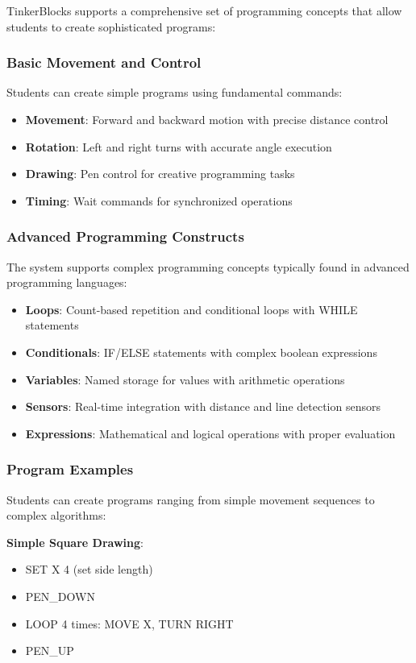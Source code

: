 TinkerBlocks supports a comprehensive set of programming concepts that allow students to create sophisticated programs:

\subsubsection{Basic Movement and Control}
Students can create simple programs using fundamental commands:
\begin{itemize}
    \item \textbf{Movement}: Forward and backward motion with precise distance control
    \item \textbf{Rotation}: Left and right turns with accurate angle execution
    \item \textbf{Drawing}: Pen control for creative programming tasks
    \item \textbf{Timing}: Wait commands for synchronized operations
\end{itemize}

\subsubsection{Advanced Programming Constructs}
The system supports complex programming concepts typically found in advanced programming languages:
\begin{itemize}
    \item \textbf{Loops}: Count-based repetition and conditional loops with WHILE statements
    \item \textbf{Conditionals}: IF/ELSE statements with complex boolean expressions
    \item \textbf{Variables}: Named storage for values with arithmetic operations
    \item \textbf{Sensors}: Real-time integration with distance and line detection sensors
    \item \textbf{Expressions}: Mathematical and logical operations with proper evaluation
\end{itemize}

\subsubsection{Program Examples}
Students can create programs ranging from simple movement sequences to complex algorithms:

\textbf{Simple Square Drawing}:
\begin{itemize}
    \item SET X 4 (set side length)
    \item PEN\_DOWN
    \item LOOP 4 times: MOVE X, TURN RIGHT
    \item PEN\_UP
\end{itemize}


